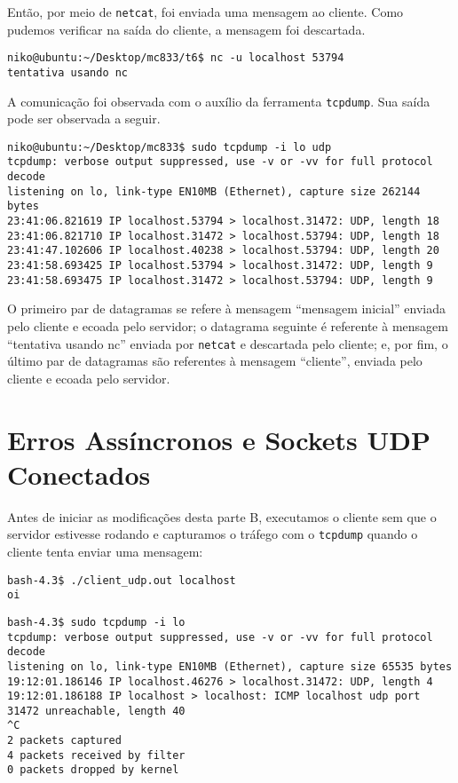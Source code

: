 \documentclass[a4paper,10pt]{article}
\begin{document}
Então, por meio de {\tt netcat}, foi enviada uma mensagem ao cliente. Como pudemos verificar na saída do cliente, a mensagem foi descartada.

\begin{lstlisting}
niko@ubuntu:~/Desktop/mc833/t6$ nc -u localhost 53794
tentativa usando nc

\end{lstlisting}

A comunicação foi observada com o auxílio da ferramenta {\tt tcpdump}. Sua saída pode ser observada a seguir.

\begin{lstlisting}
niko@ubuntu:~/Desktop/mc833$ sudo tcpdump -i lo udp
tcpdump: verbose output suppressed, use -v or -vv for full protocol decode
listening on lo, link-type EN10MB (Ethernet), capture size 262144 bytes
23:41:06.821619 IP localhost.53794 > localhost.31472: UDP, length 18
23:41:06.821710 IP localhost.31472 > localhost.53794: UDP, length 18
23:41:47.102606 IP localhost.40238 > localhost.53794: UDP, length 20
23:41:58.693425 IP localhost.53794 > localhost.31472: UDP, length 9
23:41:58.693475 IP localhost.31472 > localhost.53794: UDP, length 9

\end{lstlisting}

O primeiro par de datagramas se refere à mensagem ``mensagem inicial'' enviada pelo cliente e ecoada pelo servidor; o datagrama seguinte é referente à mensagem ``tentativa usando nc'' enviada por {\tt netcat} e descartada pelo cliente; e, por fim, o último par de datagramas são referentes à mensagem ``cliente'', enviada pelo cliente e ecoada pelo servidor.

\part{Erros Assíncronos e Sockets UDP Conectados}
Antes de iniciar as modificações desta parte B, executamos o cliente sem que o servidor estivesse rodando e capturamos o tráfego com o {\tt tcpdump} quando o cliente tenta enviar uma mensagem:

\begin{lstlisting}
bash-4.3$ ./client_udp.out localhost
oi

\end{lstlisting}

\begin{lstlisting}
bash-4.3$ sudo tcpdump -i lo
tcpdump: verbose output suppressed, use -v or -vv for full protocol decode
listening on lo, link-type EN10MB (Ethernet), capture size 65535 bytes
19:12:01.186146 IP localhost.46276 > localhost.31472: UDP, length 4
19:12:01.186188 IP localhost > localhost: ICMP localhost udp port 31472 unreachable, length 40
^C
2 packets captured
4 packets received by filter
0 packets dropped by kernel

\end{lstlisting}
\end{document}
